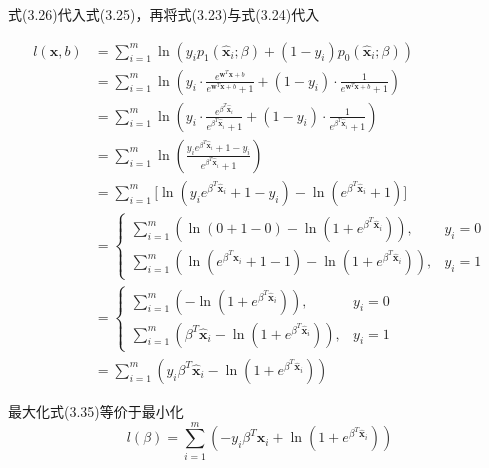 \documentclass[../studies-ml.tex]{subfiles}
\begin{document}
\newpage

式(3.26)代入式(3.25)，再将式(3.23)与式(3.24)代入

\begin{equation*}
  \begin{split}
    l(\pmb{x},b) & = \sum_{i=1}^{m}\ln(y_i p_1(\hat{\pmb{x}}_i;\beta) + (1-y_i) p_0(\hat{\pmb{x}}_i;\beta)) \\
    & = \sum_{i=1}^{m}\ln(
    y_i \cdot \frac{e^{\pmb{w}^T\pmb{x}+b}}{e^{\pmb{w}^T\pmb{x}+b} + 1} +
    (1-y_i) \cdot \frac{1}{e^{\pmb{w}^T\pmb{x}+b} + 1}
    ) \\
    & = \sum_{i=1}^{m}\ln(
    y_i \cdot \frac{e^{\beta^T\hat{\pmb{x}}_i}}{e^{\beta^T\hat{\pmb{x}}_i} + 1} +
    (1-y_i) \cdot \frac{1}{e^{\beta^T\hat{\pmb{x}}_i} + 1}
    ) \\
    & = \sum_{i=1}^{m}\ln(
    \frac{y_i e^{\beta^T\hat{\pmb{x}}_i} + 1 - y_i}{e^{\beta^T\hat{\pmb{x}}_i} + 1}
    ) \\
    & = \sum_{i=1}^{m}\Big[
      \ln(y_i e^{\beta^T\hat{\pmb{x}}_i} + 1 - y_i) - \ln(e^{\beta^T\hat{\pmb{x}}_i} + 1)
      \Big] \\
    & = \begin{cases}
      \sum_{i=1}^{m}(\ln(0+1-0) - \ln(1+e^{\beta^T\hat{\pmb{x}}_i})),                          & y_i = 0 \\
      \sum_{i=1}^{m}(\ln(e^{\beta^T\hat{\pmb{x}}_i}+1-1) - \ln(1+e^{\beta^T\hat{\pmb{x}}_i})), & y_i = 1
    \end{cases} \\
    & = \begin{cases}
      \sum_{i=1}^{m}(-\ln(1+e^{\beta^T\hat{\pmb{x}}_i})),                         & y_i = 0 \\
      \sum_{i=1}^{m}(\beta^T\hat{\pmb{x}}_i - \ln(1+e^{\beta^T\hat{\pmb{x}}_i})), & y_i = 1
    \end{cases} \\
    & = \sum_{i=1}^{m} (y_i \beta^T\hat{\pmb{x}}_i - \ln(1+e^{\beta^T\hat{\pmb{x}}_i}))
  \end{split}
\end{equation*}

最大化式(3.35)等价于最小化
\begin{equation}
  l(\beta) = \sum_{i=1}^{m} (-y_i \beta^T\hat{\pmb{x}}_i + \ln(1+e^{\beta^T\hat{\pmb{x}}_i}))
\end{equation}

\newpage
\end{document}
